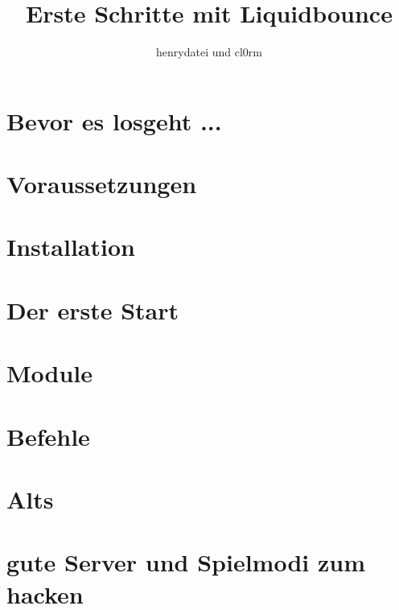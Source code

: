 \documentclass[ngerman,a4paper]{mathscript}
\title{\textbf{Erste Schritte mit Liquidbounce}}
\author{henrydatei und cl0rm}
\begin{document}
\pagestyle{plain}

\maketitle

\hypertarget{tocpage}{}
\tableofcontents
{}

\pagebreak
{}
\pagestyle{fancy}

\section{Bevor es losgeht ...}

\pagebreak

\section{Voraussetzungen}

\pagebreak

\section{Installation}

\pagebreak

\section{Der erste Start}

\pagebreak

\section{Module}

\pagebreak

\section{Befehle}

\pagebreak

\section{Alts}

\pagebreak

\section{gute Server und Spielmodi zum hacken}

\end{document}
